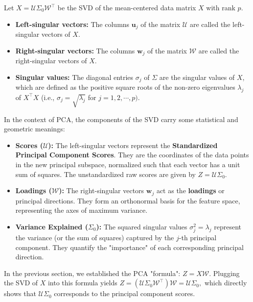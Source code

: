 \documentclass[12pt]{article}
\begin{document}
\begin{defbox}
Let $X = \mathcal{U}\Sigma_0\mathcal{W}^\top$ be the SVD of the mean-centered data matrix $X$ with rank $p$. 
\begin{itemize}
    \item \textbf{Left-singular vectors:} The columns $\boldsymbol{u}_j$ of the matrix $\mathcal{U}$ are called the left-singular vectors of $X$.
    \item \textbf{Right-singular vectors:} The columns $\boldsymbol{w}_j$ of the matrix $\mathcal{W}$ are called the right-singular vectors of $X$.
    \item \textbf{Singular values:} The diagonal entries $\sigma_j$ of $\Sigma$ are the singular values of $X$, which are defined as the positive square roots of the non-zero eigenvalues $\lambda_j$ of $X^\top X$ (i.e., $\sigma_j = \sqrt{\lambda_j}$ for $j=1,2,\cdots,p).$
\end{itemize}
\end{defbox}

\begin{remark}
In the context of PCA, the components of the SVD carry some statistical and geometric meanings:
\begin{itemize}
    \item \textbf{Scores ($\mathcal{U}$):} The left-singular vectors represent the \textbf{Standardized Principal Component Scores}. They are the coordinates of the data points in the new principal subspace, normalized such that each vector has a unit sum of squares. The unstandardized raw scores are given by $Z = \mathcal{U}\Sigma_0$.
    \item \textbf{Loadings ($\mathcal{W}$):} The right-singular vectors $\boldsymbol{w}_j$ act as the \textbf{loadings} or principal directions. They form an orthonormal basis for the feature space, representing the axes of maximum variance.
    \item \textbf{Variance Explained ($\Sigma_0$):} The squared singular values $\sigma_j^2 = \lambda_j$ represent the variance (or the sum of squares) captured by the $j$-th principal component. They quantify the "importance" of each corresponding principal direction.
\end{itemize}
\end{remark}



In the previous section, we established the PCA "formula": $Z=X\mathcal{W}.$
Plugging the SVD of $X$ into this formula yields $Z=(\mathcal{U}\Sigma_0\mathcal{W}^\top)\mathcal{W}=\mathcal{U}\Sigma_0,$ which directly shows that $\mathcal{U}\Sigma_0$ corresponds to the principal component scores.
\end{document}
